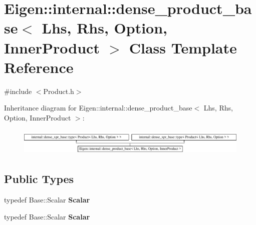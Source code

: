 \hypertarget{class_eigen_1_1internal_1_1dense__product__base_3_01_lhs_00_01_rhs_00_01_option_00_01_inner_product_01_4}{}\section{Eigen\+:\+:internal\+:\+:dense\+\_\+product\+\_\+base$<$ Lhs, Rhs, Option, Inner\+Product $>$ Class Template Reference}
\label{class_eigen_1_1internal_1_1dense__product__base_3_01_lhs_00_01_rhs_00_01_option_00_01_inner_product_01_4}


{\ttfamily \#include $<$Product.\+h$>$}

Inheritance diagram for Eigen\+:\+:internal\+:\+:dense\+\_\+product\+\_\+base$<$ Lhs, Rhs, Option, Inner\+Product $>$\+:\begin{figure}[H]
\begin{center}
\leavevmode
\includegraphics[height=1.314554cm]{class_eigen_1_1internal_1_1dense__product__base_3_01_lhs_00_01_rhs_00_01_option_00_01_inner_product_01_4}
\end{center}
\end{figure}
\subsection*{Public Types}
\begin{DoxyCompactItemize}
\item 
\mbox{\label{class_eigen_1_1internal_1_1dense__product__base_3_01_lhs_00_01_rhs_00_01_option_00_01_inner_product_01_4_abfe99694ea98255ca1d246365f3dcffe}} 
typedef Base\+::\+Scalar {\bfseries Scalar}
\item 
\mbox{\label{class_eigen_1_1internal_1_1dense__product__base_3_01_lhs_00_01_rhs_00_01_option_00_01_inner_product_01_4_abfe99694ea98255ca1d246365f3dcffe}} 
typedef Base\+::\+Scalar {\bfseries Scalar}
\end{DoxyCompactItemize}
